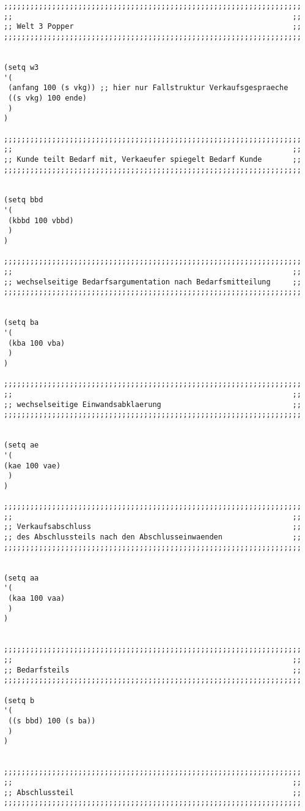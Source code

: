 \documentclass[12pt]{article}
\begin{document}
\begin{verbatim}
;;;;;;;;;;;;;;;;;;;;;;;;;;;;;;;;;;;;;;;;;;;;;;;;;;;;;;;;;;;;;;;;;;;;
;;                                                                ;;
;; Welt 3 Popper                                                  ;;
;;;;;;;;;;;;;;;;;;;;;;;;;;;;;;;;;;;;;;;;;;;;;;;;;;;;;;;;;;;;;;;;;;;;


(setq w3
'(
 (anfang 100 (s vkg)) ;; hier nur Fallstruktur Verkaufsgespraeche
 ((s vkg) 100 ende) 
 )
)

;;;;;;;;;;;;;;;;;;;;;;;;;;;;;;;;;;;;;;;;;;;;;;;;;;;;;;;;;;;;;;;;;;;;
;;                                                                ;;
;; Kunde teilt Bedarf mit, Verkaeufer spiegelt Bedarf Kunde       ;;
;;;;;;;;;;;;;;;;;;;;;;;;;;;;;;;;;;;;;;;;;;;;;;;;;;;;;;;;;;;;;;;;;;;;


(setq bbd
'(
 (kbbd 100 vbbd)
 )
)

;;;;;;;;;;;;;;;;;;;;;;;;;;;;;;;;;;;;;;;;;;;;;;;;;;;;;;;;;;;;;;;;;;;;
;;                                                                ;;
;; wechselseitige Bedarfsargumentation nach Bedarfsmitteilung     ;;
;;;;;;;;;;;;;;;;;;;;;;;;;;;;;;;;;;;;;;;;;;;;;;;;;;;;;;;;;;;;;;;;;;;;


(setq ba
'(
 (kba 100 vba)
 )
)

;;;;;;;;;;;;;;;;;;;;;;;;;;;;;;;;;;;;;;;;;;;;;;;;;;;;;;;;;;;;;;;;;;;;
;;                                                                ;;
;; wechselseitige Einwandsabklaerung                              ;;
;;;;;;;;;;;;;;;;;;;;;;;;;;;;;;;;;;;;;;;;;;;;;;;;;;;;;;;;;;;;;;;;;;;;


(setq ae
'(
(kae 100 vae)
 )
)

;;;;;;;;;;;;;;;;;;;;;;;;;;;;;;;;;;;;;;;;;;;;;;;;;;;;;;;;;;;;;;;;;;;;
;;                                                                ;;
;; Verkaufsabschluss                                              ;;
;; des Abschlussteils nach den Abschlusseinwaenden                ;;
;;;;;;;;;;;;;;;;;;;;;;;;;;;;;;;;;;;;;;;;;;;;;;;;;;;;;;;;;;;;;;;;;;;;


(setq aa
'(
 (kaa 100 vaa)
 )
)


;;;;;;;;;;;;;;;;;;;;;;;;;;;;;;;;;;;;;;;;;;;;;;;;;;;;;;;;;;;;;;;;;;;;
;;                                                                ;;
;; Bedarfsteils                                                   ;;
;;;;;;;;;;;;;;;;;;;;;;;;;;;;;;;;;;;;;;;;;;;;;;;;;;;;;;;;;;;;;;;;;;;;

(setq b
'(
 ((s bbd) 100 (s ba))
 )
)


;;;;;;;;;;;;;;;;;;;;;;;;;;;;;;;;;;;;;;;;;;;;;;;;;;;;;;;;;;;;;;;;;;;;
;;                                                                ;;
;; Abschlussteil                                                  ;;
;;;;;;;;;;;;;;;;;;;;;;;;;;;;;;;;;;;;;;;;;;;;;;;;;;;;;;;;;;;;;;;;;;;;



\end{verbatim}
\end{document}
